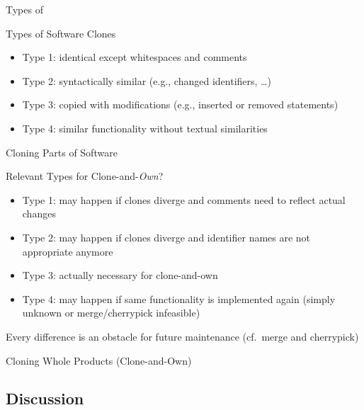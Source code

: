 \begin{frame}[b]{Types of \myframetitle}
	\begin{mycolumns}[b,height=\textheightwithtitle]
		\begin{definition}{Types of Software Clones}
			\begin{itemize}
			\item Type 1: identical except whitespaces and comments
			\item Type 2: syntactically similar (e.g., changed identifiers, \ldots)
			\item Type 3: copied with modifications (e.g., inserted or removed statements)
			\item Type 4: similar functionality without textual similarities
			\end{itemize}
		\end{definition}
		\begin{example}{Cloning Parts of Software}
			~\hfill{}\hfill{}\hfill~
		\end{example}
	\mynextcolumn
		\begin{note}{Relevant Types for Clone-and-\emph{Own}?}
			\begin{itemize}
			\item Type 1: may happen if clones diverge and comments need to reflect actual changes
			\item Type 2: may happen if clones diverge and identifier names are not appropriate anymore
			\item Type 3: actually necessary for clone-and-own
			\item Type 4: may happen if same functionality is implemented again (simply unknown or merge/cherrypick infeasible) 
			\end{itemize}
			Every difference is an obstacle for future maintenance (cf.\ merge and cherrypick)
		\end{note}
		\begin{example}{Cloning Whole Products (Clone-and-Own)}
			~\hfill{}\hfill{}\hfill~
		\end{example}
	\end{mycolumns}
\end{frame}

\subsection{Discussion}

